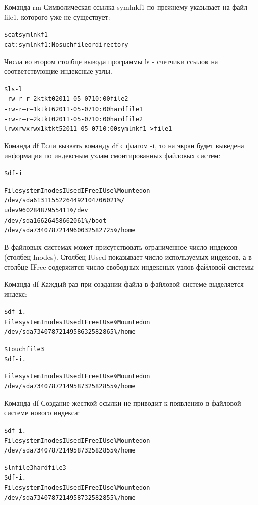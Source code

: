 \documentclass{beamer}
\begin{document}
\begin{frame}[fragile]{Команда rm}
Символическая ссылка symlnkf1 по-прежнему указывает на файл file1, которого уже не существует:
\begin{alltt}
\$ cat symlnkf1
cat: symlnkf1: No such file or directory
\end{alltt}
Числа во втором столбце вывода программы ls - счетчики ссылок на соответствующие индексные узлы.
\begin{alltt}
\$ ls -l
-rw-r--r-- 2 kt kt 0 2011-05-07 10:00 file2
-rw-r--r-- 1 kt kt 6 2011-05-07 10:00 hardfile1
-rw-r--r-- 2 kt kt 0 2011-05-07 10:00 hardfile2
lrwxrwxrwx 1 kt kt 5 2011-05-07 10:00 symlnkf1 -> file1
\end{alltt}
\end{frame}

\begin{frame}[fragile]{Команда df}
Если вызвать команду df с флагом -i, то на экран будет выведена информация по индексным узлам смонтированных файловых систем:
\begin{alltt}
\$ df -i

Filesystem Inodes IUsed IFree IUse\% Mounted on
/dev/sda6 1311552 264492 1047060 21\% /
udev 96028 487 95541 1\% /dev
/dev/sda1 66264 58 66206 1\% /boot
/dev/sda7 3407872 149600 3258272 5\% /home
\end{alltt}
В файловых системах может присутствовать ограниченное число индексов (столбец Inodes). Столбец IUsed показывает число используемых индексов, а в столбце IFree содержится число свободных индексных узлов файловой системы
\end{frame}

\begin{frame}[fragile]{Команда df}
Каждый раз при создании файла в файловой системе выделяется индекс:
\begin{alltt}
\$ df -i .
Filesystem Inodes IUsed IFree IUse\% Mounted on
/dev/sda7 3407872 149586 3258286 5\% /home

\$ touch file3
\$ df -i .

Filesystem Inodes IUsed IFree IUse\% Mounted on
/dev/sda7 3407872 149587 3258285 5\% /home
\end{alltt}
\end{frame}

\begin{frame}[fragile]{Команда df}
Создание жесткой ссылки не приводит к появлению в файловой системе нового
индекса:
\begin{alltt}
\$ df -i .
Filesystem Inodes IUsed IFree IUse\% Mounted on
/dev/sda7 3407872 149587 3258285 5\% /home

\$ ln file3 hardfile3
\$ df -i .
Filesystem Inodes IUsed IFree IUse\% Mounted on
/dev/sda7 3407872 149587 3258285 5\% /home
\end{alltt}
\end{frame}
\end{document}
